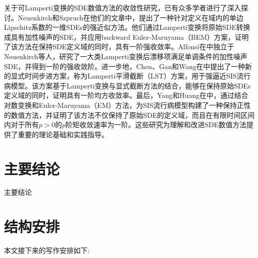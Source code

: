 关于可Lamperti变换的SDE数值方法的收敛性研究，已有众多学者进行了深入探讨。Neuenkirch和Szpruch在他们的文章\cite{neuenkirch2014first}中，提出了一种针对定义在域内的单边Lipschitz系数的一维SDEs的强近似方法。他们通过Lamperti变换将原始SDE转换成具有加性噪声的SDE，并应用backward Euler-Maruyama（BEM）方案，证明了该方法在保持SDE定义域的同时，具有一阶强收敛率。Alfonsi在\cite{Alfonsi2013602}中独立于Neuenkirch等人，研究了一大类Lamperti变换后漂移项满足单调条件的加性噪声SDE，并得到一阶的强收敛阶。进一步地，Chen、Gan和Wang在\cite{chen2021first}中提出了一种新的显式时间步进方案，称为Lamperti平滑截断（LST）方案，用于强逼近SIS流行病模型。该方案基于Lamperti变换与显式截断方法的结合，能够在保持原始SDEs定义域的同时，证明具有一阶均方收敛率。最后，Yang和Huang在\cite{yang2021first}中，通过结合对数变换和Euler-Maruyama（EM）方法，为SIS流行病模型构建了一种保持正性的数值方法，并证明了该方法不仅保持了原始SDE的定义域，而且在有限时间区间内对于所有\( p > 0 \)的\( p \)阶矩收敛速率为一阶。这些研究为理解和改进SDE数值方法提供了重要的理论基础和实践指导。


\section{主要结论}\label{sec:mainResults}

主要结论


\section{结构安排}

本文接下来的写作安排如下:


